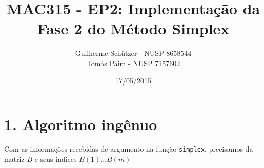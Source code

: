 \documentclass[a4paper]{article}
\title{MAC315 - EP2: Implementação da Fase 2 do Método Simplex}
\author{
	Guilherme Schützer - NUSP 8658544 \\
	Tomás Paim         - NUSP 7157602
}
\date{17/05/2015}
\begin{document}
\maketitle

\section{1. Algoritmo ingênuo}
Com as informações recebidas de argumento na função \texttt{simplex}, precisamos da matriz $B$ e seus índices $B(1)...B(m)$
\end{document}
